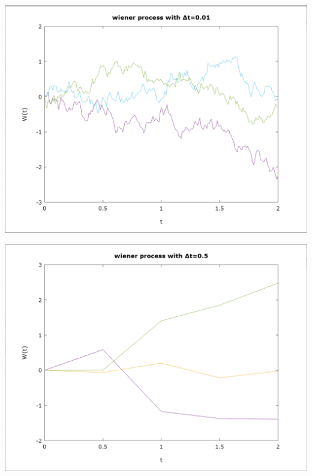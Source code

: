 \documentclass[10pt,a4paper]{article}
\begin{document}
\begin{center}
\includegraphics[scale=0.5]{wiener_001.jpeg}

\includegraphics[scale=0.5]{wiener_05.jpeg}
\end{center}
\end{document}
